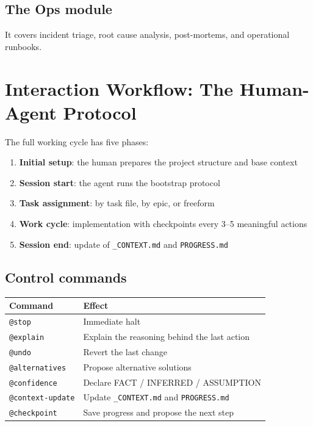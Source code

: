 \subsection{The Ops module}
It covers incident triage, root cause analysis, post-mortems, and operational runbooks.

\section{Interaction Workflow: The Human-Agent Protocol}

The full working cycle has five phases:
\begin{enumerate}
  \item \textbf{Initial setup}: the human prepares the project structure and base context
  \item \textbf{Session start}: the agent runs the bootstrap protocol
  \item \textbf{Task assignment}: by task file, by epic, or freeform
  \item \textbf{Work cycle}: implementation with checkpoints every 3--5 meaningful actions
  \item \textbf{Session end}: update of \texttt{\_CONTEXT.md} and \texttt{PROGRESS.md}
\end{enumerate}

\subsection{Control commands}

\begin{center}
\begin{tabularx}{\textwidth}{l X}
\toprule
\textbf{Command} & \textbf{Effect} \\
\midrule
\texttt{@stop} & Immediate halt \\
\texttt{@explain} & Explain the reasoning behind the last action \\
\texttt{@undo} & Revert the last change \\
\texttt{@alternatives} & Propose alternative solutions \\
\texttt{@confidence} & Declare FACT / INFERRED / ASSUMPTION \\
\texttt{@context-update} & Update \texttt{\_CONTEXT.md} and \texttt{PROGRESS.md} \\
\texttt{@checkpoint} & Save progress and propose the next step \\
\bottomrule
\end{tabularx}
\end{center}

